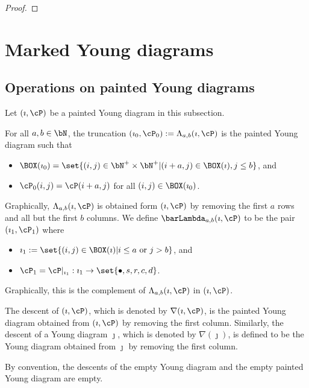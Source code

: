 \documentclass[ssunip]{subfiles}
\begin{document}
\begin{proof}
 
\end{proof}



\section{Marked Young diagrams}




\subsection{Operations on  painted Young diagrams } 
  
Let $(\imath,\cP)$ be a painted Young diagram in this subsection. 

\begin{defn}
For all $a,b\in\bN$, the truncation 
$(\imath_0, \cP_0):=\Lambda_{a,b}(\imath,\cP)$ is the painted Young diagram such that 
\begin{itemize}
    \item $\BOX(\imath_0) = \set{(i,j)\in \bN^+\times \bN^+| (i+a,j)\in \BOX(\imath), j\leq b}$, and
    \item $\cP_0(i,j) = \cP(i+a,j)$ for all $(i,j)\in \BOX(\imath_0)$.
\end{itemize}
\end{defn}
Graphically,  $\Lambda_{a,b}(\imath,\cP)$ is obtained form $(\imath,\cP)$ by removing the first $a$ rows and  all but the first $b$ columns. 
We define $\barLambda_{a,b}(\imath,\cP)$ to be the pair $(\imath_1,\cP_1)$ where 
\begin{itemize}
\item $\imath_1 := \set{(i,j)\in \BOX(\imath)| i\leq a \text{ or } j>b }$, and
\item $\cP_1 = \cP|_{\imath_1}: \imath_1\rightarrow \set{\bullet,s,r,c,d}$. 
\end{itemize}
Graphically, this is the complement of $\Lambda_{a,b}(\imath,\cP)$ in $(\imath, \cP)$.

\begin{defn}
The descent of $(\imath, \cP)$, which is denoted by $\nabla(\imath, \cP)$, is the painted Young diagram obtained from $(\imath, \cP)$ by removing the first column. Similarly, the descent of a Young diagram $\jmath$, which is denoted by $\nabla(\jmath)$, is defined to be the Young diagram obtained from $\jmath$ by removing the first column.
 \end{defn}
 By convention, the descents of the empty Young diagram and the empty painted Young diagram are empty. 
 
\end{document}
